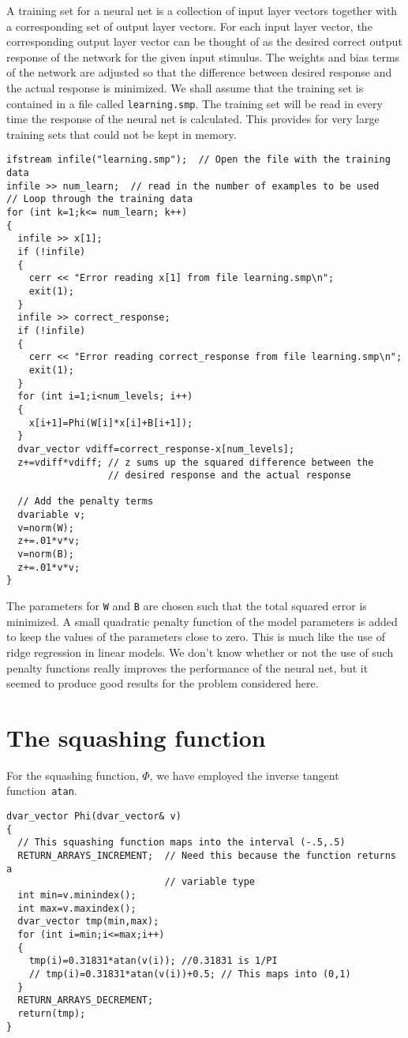 \documentclass{admbmanual}
\begin{document}
A training set for a neural net is a collection of input layer vectors together
with a corresponding set of output layer vectors. For each input layer vector,
the corresponding output layer vector can be thought of as the desired correct
output response of the network for the given input stimulus. The weights and
bias terms of the network are adjusted so that the difference between desired
response and the actual response is minimized. We shall assume that the training
set is contained in a file called \texttt{learning.smp}. The training set will
be read in every time the response of the neural net is calculated. This
provides for very large training sets that could not be kept in memory.
\begin{lstlisting}
ifstream infile("learning.smp");  // Open the file with the training data
infile >> num_learn;  // read in the number of examples to be used
// Loop through the training data
for (int k=1;k<= num_learn; k++)
{
  infile >> x[1];
  if (!infile)
  {
    cerr << "Error reading x[1] from file learning.smp\n";
    exit(1);
  }
  infile >> correct_response;
  if (!infile)
  {
    cerr << "Error reading correct_response from file learning.smp\n";
    exit(1);
  }
  for (int i=1;i<num_levels; i++)
  {
    x[i+1]=Phi(W[i]*x[i]+B[i+1]);
  }
  dvar_vector vdiff=correct_response-x[num_levels];
  z+=vdiff*vdiff; // z sums up the squared difference between the
                  // desired response and the actual response

  // Add the penalty terms
  dvariable v;
  v=norm(W);
  z+=.01*v*v;
  v=norm(B);
  z+=.01*v*v;
}
\end{lstlisting}

The parameters for \texttt{W} and \texttt{B} are chosen such that the total
squared error is minimized. A small quadratic penalty function of the model
parameters is added to keep the values of the parameters close to zero. This is
much like the use of ridge regression \cite{hoerlkennard1970} in linear models.
We don't know whether or not the use of such penalty functions really improves
the performance of the neural net, but it seemed to produce good results for the
problem considered here.

\section{The squashing function}

For the squashing function, $\Phi$, we have employed the inverse tangent
function~\texttt{atan}.
\begin{lstlisting}
dvar_vector Phi(dvar_vector& v)
{
  // This squashing function maps into the interval (-.5,.5)
  RETURN_ARRAYS_INCREMENT;  // Need this because the function returns a
                            // variable type
  int min=v.minindex();
  int max=v.maxindex();
  dvar_vector tmp(min,max);
  for (int i=min;i<=max;i++)
  {
    tmp(i)=0.31831*atan(v(i)); //0.31831 is 1/PI
    // tmp(i)=0.31831*atan(v(i))+0.5; // This maps into (0,1)
  }
  RETURN_ARRAYS_DECREMENT;
  return(tmp);
}
\end{lstlisting}
\end{document}
